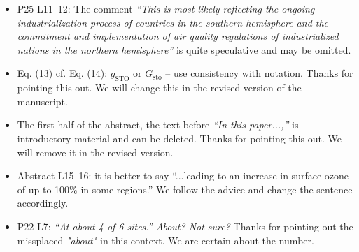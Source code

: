 \documentclass{scrartcl}
\begin{document}
\begin{itemize}
\item {\color{blue}  P25 L11--12: The comment \emph{“This is most likely reflecting the ongoing
industrialization process of countries in the southern hemisphere and the commitment
and implementation of air quality regulations of industrialized nations in the northern
hemisphere”} is quite speculative and may be omitted.}
  \emph{}
  
\item {\color{blue}  Eq. (13) cf. Eq. (14): $g_\mathrm{STO}$ or $G_\mathrm{sto}$ -- use consistency with notation.}
  Thanks for pointing this out. We will change this in the revised version of the manuscript.
  
\item {\color{blue}  The first half of the abstract, the text before \emph{“In this paper...,”} is introductory
  material and can be deleted.}
  Thanks for pointing this out. We will remove it in the revised version.
  
\item {\color{blue}  Abstract L15--16: it is better to say “...leading to an increase in surface
  ozone of up to 100\% in some regions.”}
  We follow the advice and change the sentence accordingly.
  
\item {\color{blue}  P22 L7: \emph{“At about 4 of 6 sites.” About? Not sure?}}
  Thanks for pointing out the missplaced \emph{"about"} in this context. We are certain about the number. 
  
\end{itemize}
\newpage
\end{document}
